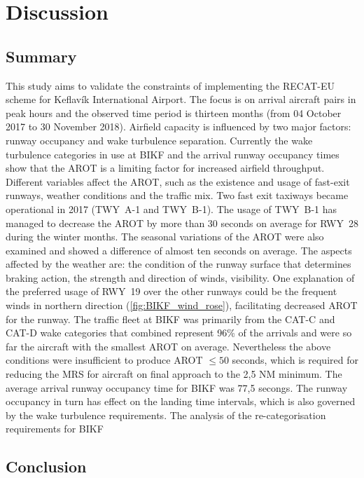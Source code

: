 


\chapter{Discussion}\label{cha:discussion}

\section{Summary}\label{sec:summary}
This study aims to validate the constraints of implementing the RECAT-EU scheme for Keflavík International Airport. The focus is on arrival aircraft pairs in peak hours and the observed time period is thirteen months (from 04 October 2017 to 30 November 2018). 
Airfield capacity is influenced by two major factors: runway occupancy and wake turbulence separation. Currently the wake turbulence categories in use at BIKF and the arrival runway occupancy times show that the AROT is a limiting factor for increased airfield throughput. Different variables affect the AROT, such as the existence and usage of fast-exit runways, weather conditions and the traffic mix. Two fast exit taxiways became operational in 2017 (TWY~A-1 and TWY~B-1). The usage of TWY~B-1 has managed to decrease the AROT by more than 30 seconds on average for RWY~28 during the winter months. The seasonal variations of the AROT were also examined and showed a difference of almost ten seconds on average. The aspects affected by the weather are: the condition of the runway surface that determines braking action, the strength and direction of winds, visibility. One explanation of the preferred usage of RWY~19 over the other runways could be the frequent winds in northern direction (\ref{fig:BIKF_wind_rose}), facilitating decreased AROT for the runway. The traffic fleet at BIKF was primarily from the CAT-C and CAT-D wake categories that combined represent 96\% of the arrivals and were so far the aircraft with the smallest AROT on average. Nevertheless the above conditions were insufficient to produce AROT $\leq 50$ seconds, which is required for reducing the MRS for aircraft on final approach to the 2,5 NM minimum. The average arrival runway occupancy time for BIKF was 77,5 secongs. The runway occupancy in turn has effect on the landing time intervals, which is also governed by the wake turbulence requirements.
The analysis of the re-categorisation requirements for BIKF 







\section{Conclusion\label{sec:conclusions}}





